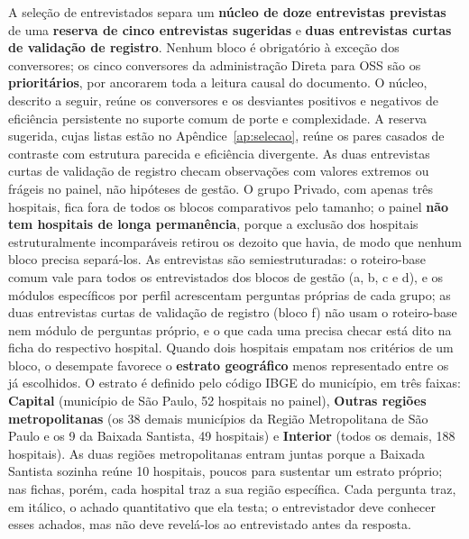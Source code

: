 \newpage
A seleção de entrevistados separa um \textbf{núcleo de doze entrevistas
previstas} de uma \textbf{reserva de cinco entrevistas sugeridas} e
\textbf{duas entrevistas curtas de validação de registro}. Nenhum bloco
é obrigatório à exceção dos conversores; os cinco conversores da
administração Direta para OSS são os \textbf{prioritários}, por
ancorarem toda a leitura causal do documento. O núcleo, descrito a
seguir, reúne os conversores e os desviantes positivos e negativos de
eficiência persistente no suporte comum de porte e complexidade. A
reserva sugerida, cujas listas estão no Apêndice~\ref{ap:selecao},
reúne os pares casados de contraste com
estrutura parecida e eficiência divergente. As duas entrevistas curtas de
validação de
registro checam observações com valores extremos ou frágeis no painel,
não hipóteses de gestão. O grupo Privado, com apenas três hospitais,
fica fora de todos os blocos comparativos pelo tamanho; o painel
\textbf{não tem hospitais de longa permanência}, porque a exclusão dos
hospitais estruturalmente incomparáveis retirou os dezoito que havia,
de modo que nenhum bloco precisa separá-los. As entrevistas são
semiestruturadas: o roteiro-base comum vale para todos os entrevistados
dos blocos de gestão (a, b, c e d), e os módulos específicos por perfil
acrescentam perguntas próprias de cada grupo; as duas entrevistas curtas
de validação de registro (bloco f) não usam o roteiro-base nem módulo de
perguntas próprio, e o que cada uma precisa checar está dito na ficha do
respectivo hospital. Quando dois hospitais empatam
nos critérios de um bloco, o desempate favorece o \textbf{estrato
geográfico} menos representado entre os já escolhidos. O estrato é
definido pelo código IBGE do município, em três faixas: \textbf{Capital}
(município de São Paulo, 52 hospitais no painel), \textbf{Outras regiões
metropolitanas} (os 38 demais municípios da Região Metropolitana de São
Paulo e os 9 da Baixada Santista, 49 hospitais) e \textbf{Interior}
(todos os demais, 188 hospitais). As duas regiões metropolitanas entram
juntas porque a Baixada Santista sozinha reúne 10 hospitais, poucos para
sustentar um estrato próprio; nas fichas, porém, cada hospital traz a
sua região específica. Cada pergunta traz, em
itálico, o achado quantitativo que ela testa; o entrevistador deve
conhecer esses achados, mas não deve revelá-los ao entrevistado antes da
resposta.


